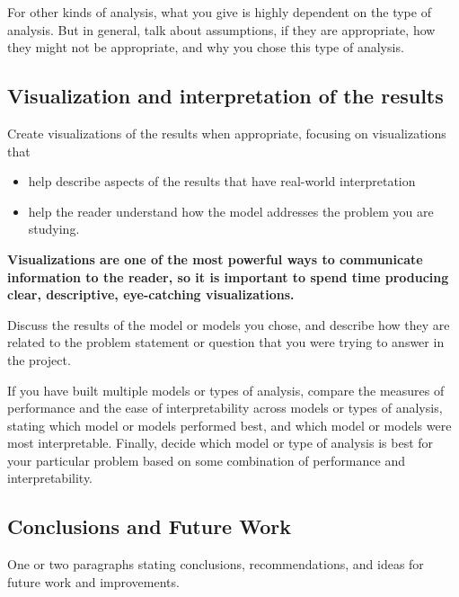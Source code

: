 \documentclass[
]{article}
\providecommand{\tightlist}{%
  \setlength{\itemsep}{0pt}\setlength{\parskip}{0pt}}
\begin{document}
For other kinds of analysis, what you give is highly dependent on the
type of analysis. But in general, talk about assumptions, if they are
appropriate, how they might not be appropriate, and why you chose this
type of analysis.

\hypertarget{visualization-and-interpretation-of-the-results}{%
\subsection{Visualization and interpretation of the
results}\label{visualization-and-interpretation-of-the-results}}

Create visualizations of the results when appropriate, focusing on
visualizations that

\begin{itemize}
\tightlist
\item
  help describe aspects of the results that have real-world
  interpretation
\item
  help the reader understand how the model addresses the problem you are
  studying.
\end{itemize}

\textbf{Visualizations are one of the most powerful ways to communicate
information to the reader, so it is important to spend time producing
clear, descriptive, eye-catching visualizations.}

Discuss the results of the model or models you chose, and describe how
they are related to the problem statement or question that you were
trying to answer in the project.

If you have built multiple models or types of analysis, compare the
measures of performance and the ease of interpretability across models
or types of analysis, stating which model or models performed best, and
which model or models were most interpretable. Finally, decide which
model or type of analysis is best for your particular problem based on
some combination of performance and interpretability.

\hypertarget{conclusions-and-future-work}{%
\subsection{Conclusions and Future
Work}\label{conclusions-and-future-work}}

One or two paragraphs stating conclusions, recommendations, and ideas
for future work and improvements.
\end{document}
